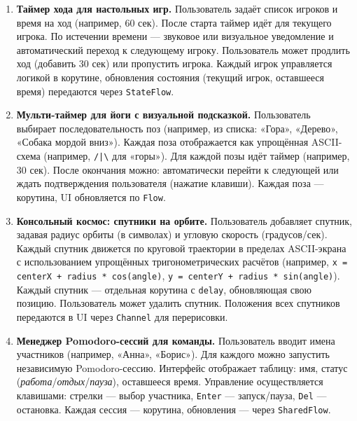 \begin{enumerate}
\item[25]
\textbf{Таймер хода для настольных игр.} Пользователь задаёт список игроков и время на ход (например, 60 сек). После старта таймер идёт для текущего игрока. По истечении времени — звуковое или визуальное уведомление и автоматический переход к следующему игроку. Пользователь может продлить ход (добавить 30 сек) или пропустить игрока. Каждый игрок управляется логикой в корутине, обновления состояния (текущий игрок, оставшееся время) передаются через \texttt{StateFlow}.

\item[26]
\textbf{Мульти-таймер для йоги с визуальной подсказкой.} Пользователь выбирает последовательность поз (например, из списка: «Гора», «Дерево», «Собака мордой вниз»). Каждая поза отображается как упрощённая ASCII-схема (например, \texttt{/|\textbackslash{}} для «горы»). Для каждой позы идёт таймер (например, 30 сек). После окончания можно: автоматически перейти к следующей или ждать подтверждения пользователя (нажатие клавиши). Каждая поза — корутина, UI обновляется по \texttt{Flow}.

\item[27]
\textbf{Консольный космос: спутники на орбите.} Пользователь добавляет спутник, задавая радиус орбиты (в символах) и угловую скорость (градусов/сек). Каждый спутник движется по круговой траектории в пределах ASCII-экрана с использованием упрощённых тригонометрических расчётов (например, \texttt{x = centerX + radius * cos(angle)}, \texttt{y = centerY + radius * sin(angle)}). Каждый спутник — отдельная корутина с \texttt{delay}, обновляющая свою позицию. Пользователь может удалить спутник. Положения всех спутников передаются в UI через \texttt{Channel} для перерисовки.

\item[28]
\textbf{Менеджер Pomodoro-сессий для команды.} Пользователь вводит имена участников (например, «Анна», «Борис»). Для каждого можно запустить независимую Pomodoro-сессию. Интерфейс отображает таблицу: имя, статус (\textit{работа}/\textit{отдых}/\textit{пауза}), оставшееся время. Управление осуществляется клавишами: стрелки — выбор участника, \texttt{Enter} — запуск/пауза, \texttt{Del} — остановка. Каждая сессия — корутина, обновления — через \texttt{SharedFlow}.
\end{enumerate}